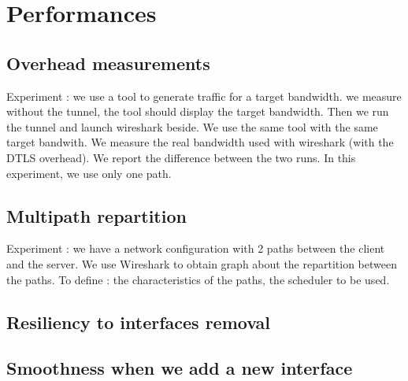 \chapter{Performances}\label{chap:perfs}

\section{Overhead measurements}

Experiment : we use a tool to generate traffic for a target bandwidth. we measure without the tunnel, the tool should display the target bandwidth. Then we run the tunnel and launch wireshark beside. We use the same tool with the same target bandwith. We measure the real bandwidth used with wireshark (with the DTLS overhead). We report the difference between the two runs. In this experiment, we use only one path.


\section{Multipath repartition}

Experiment : we have a network configuration with 2 paths between the client and the server. We use Wireshark to obtain graph about the repartition between the paths. To define : the characteristics of the paths, the scheduler to be used. 

\section{Resiliency to interfaces removal}


\section{Smoothness when we add a new interface}
